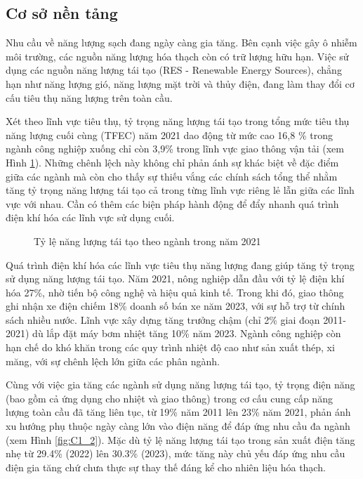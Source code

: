 \subsection{Cơ sở nền tảng}
Nhu cầu về năng lượng sạch đang ngày càng gia tăng. Bên cạnh việc gây ô nhiễm môi trường, các nguồn năng lượng hóa thạch còn có trữ lượng hữu hạn. Việc sử dụng các nguồn năng lượng tái tạo (RES - Renewable Energy Sources), chẳng hạn như năng lượng gió, năng lượng mặt trời và thủy điện, đang làm thay đổi cơ cấu tiêu thụ năng lượng trên toàn cầu.\par
Xét theo lĩnh vực tiêu thụ, tỷ trọng năng lượng tái tạo trong tổng mức tiêu thụ năng lượng cuối cùng (TFEC) năm 2021 dao động từ mức cao 16,8 \% trong ngành công nghiệp xuống chỉ còn 3,9\% trong lĩnh vực giao thông vận tải (xem Hình \ref{fig:C1_1}). Những chênh lệch này không chỉ phản ánh sự khác biệt về đặc điểm giữa các ngành mà còn cho thấy sự thiếu vắng các chính sách tổng thể nhằm tăng tỷ trọng năng lượng tái tạo cả trong từng lĩnh vực riêng lẻ lẫn giữa các lĩnh vực với nhau. Cần có thêm các biện pháp hành động để đẩy nhanh quá trình điện khí hóa các lĩnh vực sử dụng cuối.\par
\begin{figure}
    \centering
    
    \caption{Tỷ lệ năng lượng tái tạo theo ngành trong năm 2021 \cite{ren21_renewables_2021}}
    \label{fig:C1_1}
\end{figure}
Quá trình điện khí hóa các lĩnh vực tiêu thụ năng lượng đang giúp tăng tỷ trọng sử dụng năng lượng tái tạo. Năm 2021, nông nghiệp dẫn đầu với tỷ lệ điện khí hóa 27\%, nhờ tiến bộ công nghệ và hiệu quả kinh tế. Trong khi đó, giao thông ghi nhận xe điện chiếm 18\% doanh số bán xe năm 2023, với sự hỗ trợ từ chính sách nhiều nước. Lĩnh vực xây dựng tăng trưởng chậm (chỉ 2\% giai đoạn 2011-2021) dù lắp đặt máy bơm nhiệt tăng 10\% năm 2023. Ngành công nghiệp còn hạn chế do khó khăn trong các quy trình nhiệt độ cao như sản xuất thép, xi măng, với sự chênh lệch lớn giữa các phân ngành. \par
Cùng với việc gia tăng các ngành sử dụng năng lượng tái tạo, tỷ trọng điện năng (bao gồm cả ứng dụng cho nhiệt và giao thông) trong cơ cấu cung cấp năng lượng toàn cầu đã tăng liên tục, từ 19\% năm 2011 lên 23\% năm 2021, phản ánh xu hướng phụ thuộc ngày càng lớn vào điện năng để đáp ứng nhu cầu đa ngành (xem Hình \ref{fig:C1_2}). Mặc dù tỷ lệ năng lượng tái tạo trong sản xuất điện tăng nhẹ từ 29.4\% (2022) lên 30.3\% (2023), mức tăng này chủ yếu đáp ứng nhu cầu điện gia tăng chứ chưa thực sự thay thế đáng kể cho nhiên liệu hóa thạch.\par
